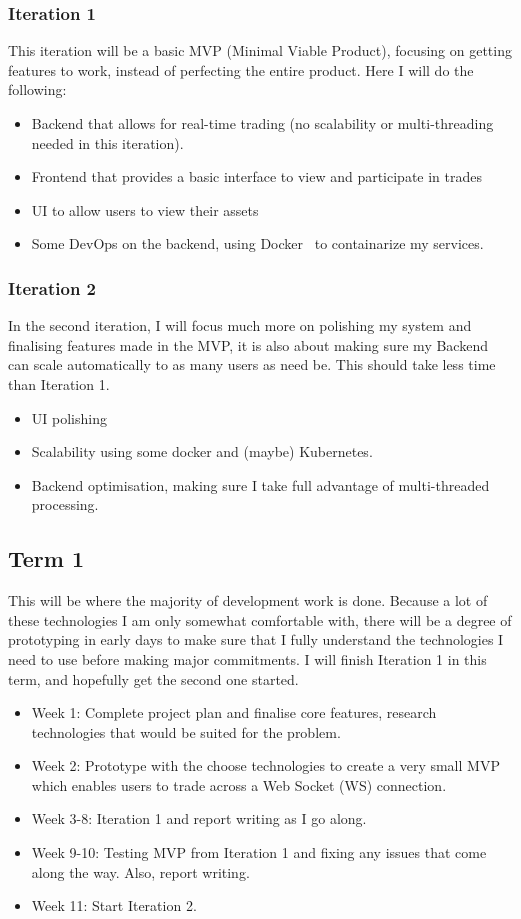 \documentclass[titlepage]{article}
\begin{document}
\subsubsection{Iteration 1}
This iteration will be a basic MVP (Minimal Viable Product), focusing on getting features to work, instead of perfecting the entire product. Here I will do the following:
\begin{itemize}
	\item Backend that allows for real-time trading (no scalability or multi-threading needed in this iteration).
	\item Frontend that provides a basic interface to view and participate in trades
	\item UI to allow users to view their assets
  \item Some DevOps on the backend, using Docker~\cite{docker} to containarize my services.
\end{itemize}

\subsubsection{Iteration 2}
In the second iteration, I will focus much more on polishing my system and finalising features made in the MVP, it is also about making sure my Backend can scale automatically to as many users as need be. This should take less time than Iteration 1.
\begin{itemize}
	\item UI polishing
	\item Scalability using some docker and (maybe) Kubernetes.
	\item Backend optimisation, making sure I take full advantage of multi-threaded processing.
\end{itemize}

\subsection{Term 1}
This will be where the majority of development work is done. Because a lot of these technologies I am only somewhat comfortable with, there will be a degree of prototyping in early days to make sure that I fully understand the technologies I need to use before making major commitments. I will finish Iteration 1 in this term, and hopefully get the second one started.


\begin{itemize}
	\item Week 1: Complete project plan and finalise core features, research technologies that would be suited for the problem.
	\item Week 2: Prototype with the choose technologies to create a very small MVP which enables users to trade across a Web Socket (WS) connection.
	\item Week 3-8: Iteration 1 and report writing as I go along.
	\item Week 9-10: Testing MVP from Iteration 1 and fixing any issues that come along the way. Also, report writing.
	\item Week 11: Start Iteration 2.
\end{itemize}
\end{document}
